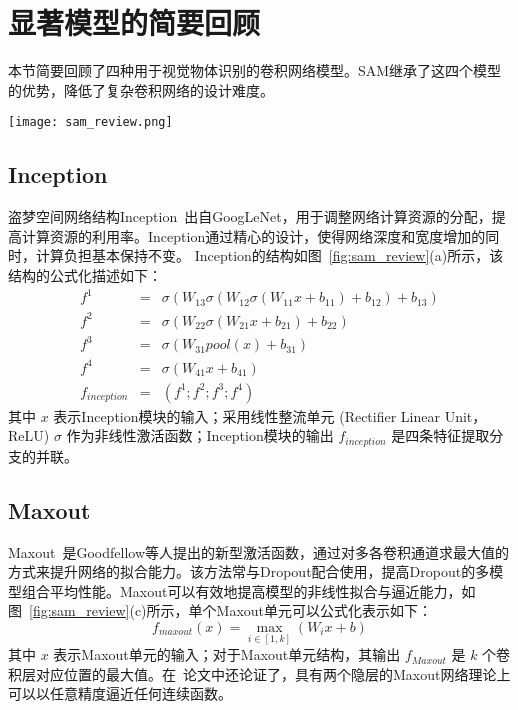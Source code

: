 \section{显著模型的简要回顾}
\label{sec:sap:review}

本节简要回顾了四种用于视觉物体识别的卷积网络模型。SAM继承了这四个模型的优势，降低了复杂卷积网络的设计难度。

\begin{figure*}[t]
\centering
\texttt{[image: sam\_review.png]}
\caption{显著模型的简要回顾. (a) Inception, (b) ResNet, (c) Maxout, (d) NIN}
\label{fig:sam_review}
\end{figure*}

\subsection{Inception}
\label{sec:sap:review:inception}

盗梦空间网络结构Inception~\cite{szegedy2014going,szegedy2015rethinking,szegedy2016inception}出自GoogLeNet，用于调整网络计算资源的分配，提高计算资源的利用率。Inception通过精心的设计，使得网络深度和宽度增加的同时，计算负担基本保持不变。 Inception的结构如图~\ref{fig:sam_review}(a)所示，该结构的公式化描述如下：
\begin{eqnarray} \label{equ:inception}
f^{1} &=& \sigma(W_{13}\sigma(W_{12}\sigma(W_{11}x+b_{11})+b_{12})+b_{13})\nonumber\\
f^{2} &=& \sigma(W_{22}\sigma(W_{21}x+b_{21})+b_{22})\nonumber\\
f^{3} &=& \sigma(W_{31}pool(x)+b_{31})\nonumber\\
f^{4} &=& \sigma(W_{41}x+b_{41})\nonumber\\
f_{inception} &=& (f^1; f^2; f^3; f^4)
\end{eqnarray}
其中 $x$ 表示Inception模块的输入；采用线性整流单元 (Rectifier Linear Unit，ReLU) $\sigma$ 作为非线性激活函数；Inception模块的输出 $f_{inception}$ 是四条特征提取分支的并联。

\subsection{Maxout}
\label{sec:sap:review:maxout}

Maxout~\cite{goodfellow2013maxout}是Goodfellow等人提出的新型激活函数，通过对多各卷积通道求最大值的方式来提升网络的拟合能力。该方法常与Dropout配合使用，提高Dropout的多模型组合平均性能。Maxout可以有效地提高模型的非线性拟合与逼近能力，如图~\ref{fig:sam_review}(c)所示，单个Maxout单元可以公式化表示如下：
\begin{equation} \label{equ:maxout}
f_{maxout}(x)=\max\limits_{i\in[1,k]}(W_{i}x+b)
\end{equation}
其中 $x$ 表示Maxout单元的输入；对于Maxout单元结构，其输出 $f_{Maxout}$ 是 $k$ 个卷积层对应位置的最大值。在~\cite{goodfellow2013maxout}论文中还论证了，具有两个隐层的Maxout网络理论上可以以任意精度逼近任何连续函数。



